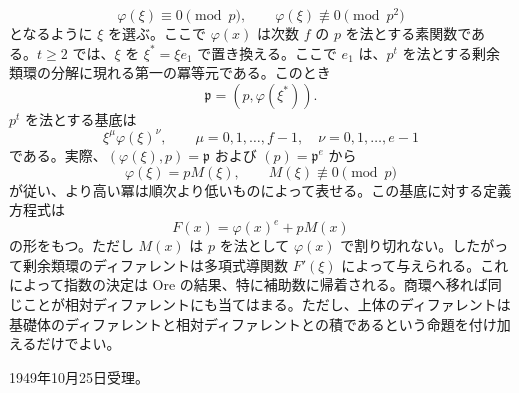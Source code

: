 \[
        \varphi(\xi)\equiv0\pmod p,
        \qquad
        \varphi(\xi)\not\equiv0\pmod {p^2}
\]
となるように \(\xi\) を選ぶ。ここで \(\varphi(x)\) は次数 \(f\) の \(p\) を法とする素関数である。\(t\ge2\) では、\(\xi\) を \(\xi^*=\xi e_1\) で置き換える。ここで \(e_1\) は、\(p^t\) を法とする剰余類環の分解に現れる第一の冪等元である。このとき
\[
        \mathfrak p=(p,\varphi(\xi^*)).
\]
\(p^t\) を法とする基底は
\[
        \xi^{\mu}\varphi(\xi)^{\nu},
        \qquad
        \mu=0,1,\ldots,f-1,
        \quad
        \nu=0,1,\ldots,e-1
\]
である。実際、\((\varphi(\xi),p)=\mathfrak p\) および \((p)=\mathfrak p^e\) から
\[
        \varphi(\xi)=pM(\xi),
        \qquad M(\xi)\not\equiv0\pmod p
\]
が従い、より高い冪は順次より低いものによって表せる。この基底に対する定義方程式は
\[
        F(x)=\varphi(x)^e+pM(x)
\]
の形をもつ。ただし \(M(x)\) は \(p\) を法として \(\varphi(x)\) で割り切れない。したがって剰余類環のディファレントは多項式導関数 \(F'(\xi)\) によって与えられる。これによって指数の決定は Ore の結果、特に補助数に帰着される。商環へ移れば同じことが相対ディファレントにも当てはまる。ただし、上体のディファレントは基礎体のディファレントと相対ディファレントとの積であるという命題を付け加えるだけでよい。

\begin{center}
1949年10月25日受理。
\end{center}
